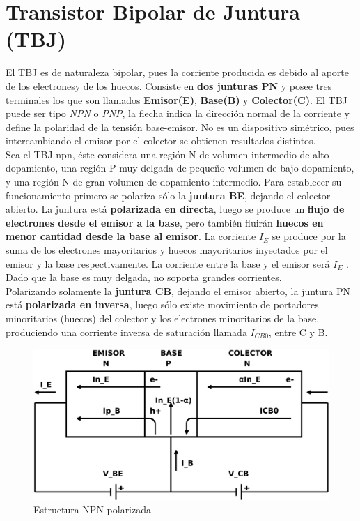 \documentclass[oneside]{book}
\numberwithin{equation}{section}
\numberwithin{figure}{section}
\numberwithin{table}{section}
\begin{document}
		\section{Transistor Bipolar de Juntura (TBJ)}
		
			El TBJ es de naturaleza bipolar, pues la corriente producida es debido al aporte de los electronesy de los huecos. Consiste en
\textbf{dos junturas PN} y posee tres terminales los que son llamados \textbf{Emisor(E)}, \textbf{Base(B)} y \textbf{Colector(C)}. El TBJ puede ser tipo \textit{NPN} o \textit{PNP}, la flecha indica la dirección normal de la corriente y define la polaridad de la tensión base-emisor. No es un dispositivo simétrico, pues intercambiando el emisor por el colector se obtienen resultados distintos.\\
		
			Sea el TBJ npn, éste considera una región N de volumen intermedio de alto dopamiento, una región P muy delgada de pequeño volumen de bajo dopamiento, y una región N de gran volumen de dopamiento intermedio. Para establecer su funcionamiento primero se polariza sólo la \textbf{juntura BE}, dejando el colector abierto. La juntura está \textbf{polarizada en directa}, luego se produce un \textbf{flujo de electrones desde el emisor a la base}, pero también fluirán \textbf{huecos en menor cantidad desde la base al emisor}. La corriente $I_E$ se produce por la suma de los electrones mayoritarios y huecos mayoritarios inyectados por el emisor y la base respectivamente. La corriente entre la base y el emisor será $I_E$ . Dado que la base es muy delgada, no soporta grandes corrientes.\\
		
			Polarizando solamente la \textbf{juntura CB}, dejando el emisor abierto, la juntura PN está \textbf{polarizada en inversa}, luego sólo existe movimiento de portadores minoritarios (huecos) del colector y los electrones minoritarios de la base, produciendo una corriente inversa de saturación llamada $I_{CB0}$, entre C y B.\\

				\begin{figure}[H]
					\begin{center}
						\includegraphics[scale=0.1]{NPN.jpeg}
						\caption{Estructura NPN polarizada}
					\end{center}
				\end{figure}	
				
\end{document}
